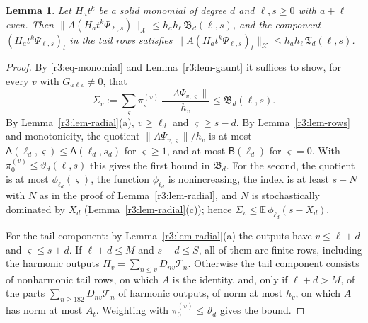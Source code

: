 \documentclass[11pt]{amsart}
\newtheorem{lemma}[theorem]{Lemma}
\theoremstyle{definition}
\theoremstyle{remark}
\numberwithin{equation}{section}
\newcommand{\nrm}[1]{\lVert #1\rVert}
\begin{document}
\begin{lemma}\label{r3:lem-envelope}
Let $H_at^k$ be a solid monomial of degree $d$ and $\ell,s\geq0$ with $a+\ell$ even. Then $\nrm{A(H_at^k\Psi_{\ell,s})}_{\mathcal X}\leq h_ah_\ell\,\mathfrak B_d(\ell,s)$, and the component $(H_at^k\Psi_{\ell,s})_t$ in the tail rows satisfies $\nrm{A(H_at^k\Psi_{\ell,s})_t}_{\mathcal X}\leq h_ah_\ell\,\mathfrak T_d(\ell,s)$.
\end{lemma}

\begin{proof}
By \eqref{r3:eq-monomial} and Lemma~\ref{r3:lem-gaunt} it suffices to show, for every $v$ with $G_{a\ell v}\neq0$, that
\[
\Sigma_v:=\sum_\varsigma\pi^{(v)}_\varsigma\,\frac{\nrm{A\Psi_{v,\varsigma}}}{h_v}\leq\mathfrak B_d(\ell,s) .
\]
By Lemma~\ref{r3:lem-radial}(a), $v\geq\ell_d$ and $\varsigma\geq s-d$. By Lemma~\ref{r3:lem-rows} and monotonicity, the quotient $\nrm{A\Psi_{v,\varsigma}}/h_v$ is at most $\mathsf A(\ell_d,\varsigma)\leq\mathsf A(\ell_d,s_d)$ for $\varsigma\geq1$, and at most $\mathsf B(\ell_d)$ for $\varsigma=0$. With $\pi^{(v)}_0\leq\vartheta_d(\ell,s)$ this gives the first bound in $\mathfrak B_d$. For the second, the quotient is at most $\phi_{\ell_d}(\varsigma)$, the function $\phi_{\ell_d}$ is nonincreasing, the index is at least $s-N$ with $N$ as in the proof of Lemma~\ref{r3:lem-radial}, and $N$ is stochastically dominated by $X_d$ (Lemma~\ref{r3:lem-radial}(c)); hence $\Sigma_v\leq\mathbb E\,\phi_{\ell_d}(s-X_d)$.

For the tail component: by Lemma~\ref{r3:lem-radial}(a) the outputs have $v\leq\ell+d$ and $\varsigma\leq s+d$. If $\ell+d\leq M$ and $s+d\leq S$, all of them are finite rows, including the harmonic outputs $H_v=\sum_{n\leq v}D_{nv}\mathcal T_n$. Otherwise the tail component consists of nonharmonic tail rows, on which $A$ is the identity, and, only if $\ell+d>M$, of the parts $\sum_{n\geq182}D_{nv}\mathcal T_n$ of harmonic outputs, of norm at most $h_v$, on which $A$ has norm at most $A_t$. Weighting with $\pi^{(v)}_0\leq\vartheta_d$ gives the bound.
\end{proof}
\end{document}
